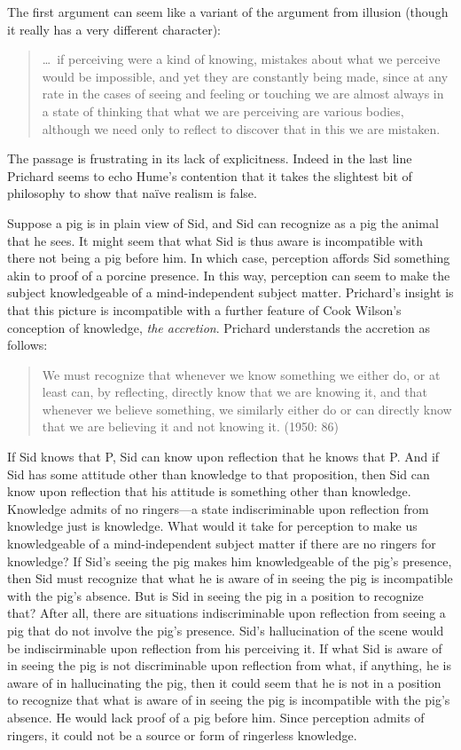 \documentclass[11pt]{article}
\begin{document}
The first argument can seem like a variant of the argument from illusion (though it really has a very different character): 
\begin{quote}
	\ldots\ if perceiving were a kind of knowing, mistakes about what we perceive would be impossible, and yet they are constantly being made, since at any rate in the cases of seeing and feeling or touching we are almost always in a state of thinking that what we are perceiving are various bodies, although we need only to reflect to discover that in this we are mistaken. \citep[11]{Prichard:1938ve}
\end{quote}
The passage is frustrating in its lack of explicitness. Indeed in the last line Prichard seems to echo Hume’s contention that it takes the slightest bit of philosophy to show that naïve realism is false. 

Suppose a pig is in plain view of Sid, and Sid can recognize as a pig the animal that he sees. It might seem that what Sid is thus aware is incompatible with there not being a pig before him. In which case, perception affords Sid something akin to proof of a porcine presence. In this way, perception can seem to make the subject knowledgeable of a mind-independent subject matter. Prichard's insight is that this picture is incompatible with a further feature of Cook Wilson's conception of knowledge, \emph{the accretion}. Prichard understands the accretion as follows:
\begin{quote}
	We must recognize that whenever we know something we either do, or at least can, by reflecting, directly know that we are knowing it, and that whenever we believe something, we similarly either do or can directly know that we are believing it and not knowing it. (1950: 86)
\end{quote}
If Sid knows that P, Sid can know upon reflection that he knows that P. And if Sid has some attitude other than knowledge to that proposition, then Sid can know upon reflection that his attitude is something other than knowledge. Knowledge admits of no ringers---a state indiscriminable upon reflection from knowledge just is knowledge. What would it take for perception to make us knowledgeable of a mind-independent subject matter if there are no ringers for knowledge? If Sid's seeing the pig makes him knowledgeable of the pig's presence, then Sid must recognize that what he is aware of in seeing the pig is incompatible with the pig's absence. But is Sid in seeing the pig in a position to recognize that? After all, there are situations indiscriminable upon reflection from seeing a pig that do not involve the pig's presence. Sid's hallucination of the scene would be indiscirminable upon reflection from his perceiving it. If what Sid is aware of in seeing the pig is not discriminable upon reflection from what, if anything, he is aware of in hallucinating the pig, then it could seem that he is not in a position to recognize that what is aware of in seeing the pig is incompatible with the pig's absence. He would lack proof of a pig before him. Since perception admits of ringers, it could not be a source or form of ringerless knowledge.
\end{document}
